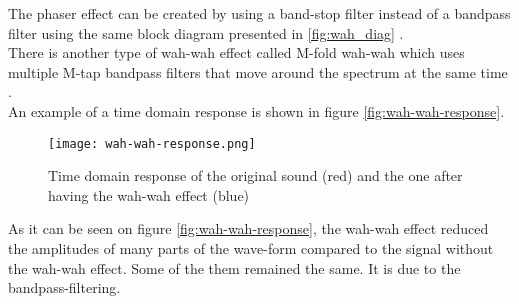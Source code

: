 The phaser effect can be created by using a band-stop filter instead of a bandpass filter using the same block diagram presented in \autoref{fig:wah_diag} \citep{wah-wah_cardiff}. \\

There is another type of wah-wah effect called M-fold wah-wah which uses multiple M-tap bandpass filters that move around the spectrum at the same time \citep{wah-wah_cardiff}. \\

An example of a time domain response is shown in figure \autoref{fig:wah-wah-response}. \\

\begin{figure} [htbp!]
	\centering
	\texttt{[image: wah-wah-response.png]}
	\caption{Time domain response of the original sound (red) and the one after having the wah-wah effect (blue)}
	\label{fig:wah-wah-response}
\end{figure}


As it can be seen on figure \autoref{fig:wah-wah-response}, the wah-wah effect reduced the amplitudes of many parts of the wave-form compared to the signal without the wah-wah effect. Some of the them remained the same. It is due to the bandpass-filtering.
